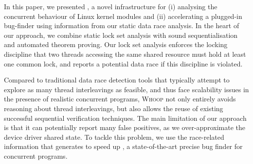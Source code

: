 In this paper, we presented \whoop, a novel infrastructure for (i) analysing the concurrent behaviour of Linux kernel modules and (ii) accelerating a plugged-in bug-finder using information from our static data race analysis. In the heart of our approach, we combine static lock set analysis with sound sequentialisation and automated theorem proving. Our lock set analysis enforces the locking discipline that two threads accessing the same shared resource must hold at least one common lock, and reports a potential data race if this discipline is violated.

Compared to traditional data race detection tools that typically attempt to explore as many thread interleavings as feasible, and thus face scalability issues in the presence of realistic concurrent programs, \textsc{Whoop} not only entirely avoids reasoning about thread interleavings, but also allows the reuse of existing successful sequential verification techniques. The main limitation of our approach is that it can potentially report many false positives, as we over-approximate the device driver shared state. To tackle this problem, we use the race-related information that \whoop generates to speed up \corral, a state-of-the-art precise bug finder for concurrent programs.